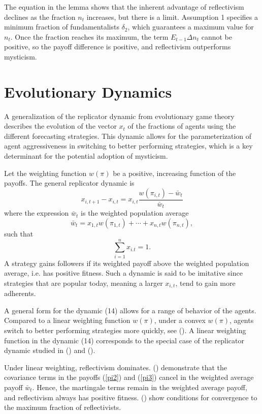\documentclass[12pt]{article}
\begin{document}
The equation in the lemma shows that the inherent advantage of reflectivism declines as the fraction $n_{t}$ increases, but there is a limit. Assumption 1 specifies a minimum fraction of fundamentalists $\delta_{2}$, which guarantees a maximum value for $n_{t}$. Once the fraction reaches its maximum, the term $E_{t-1}\Delta n_{t}$ cannot be positive, so the payoff difference is positive, and reflectivism outperforms mysticism.

\section{Evolutionary Dynamics}
A generalization of the replicator dynamic from evolutionary game theory describes the evolution of the vector $x_{t}$ of the fractions of agents using the different forecasting strategies. This dynamic allows for the parameterization of agent aggressiveness in switching to better performing strategies, which is a key determinant for the potential adoption of mysticism.

Let the weighting function $w(\pi)$ be a positive, increasing function of the payoffs. The general replicator dynamic is
\begin{equation}
x_{i, t+1}-x_{i, t}=x_{i, t} \frac{w\left(\pi_{i, t}\right)-\bar{w}_{t}}{\bar{w}_{t}} 
\label{rep gen}
\end{equation}
where the expression $\bar{w}_{t}$ is the weighted population average 
\[\bar{w}_{t}=x_{1, t} w\left(\pi_{1, t}\right)+\cdots+x_{n, t} w\left(\pi_{n, t}\right),\] 
such that
\[\sum_{i=1}^{n} x_{i . t}=1.\]
A strategy gains followers if its weighted payoff above the weighted population average, i.e.
has positive fitness. Such a dynamic is said to be imitative since strategies that are popular today, meaning a larger $x_{i, t}$, tend to gain more adherents.

A general form for the dynamic (14) allows for a range of behavior of the agents. Compared to a linear weighting function $w(\pi)$, under a convex $w(\pi)$, agents switch to better performing strategies more quickly, see \citeauthor{hofbauer1996evolutionary} (\citeyear{hofbauer1996evolutionary}). A linear weighting function in the dynamic (14) corresponds to the special case of the replicator dynamic studied in \citeauthor{weibull1998evolutionary} (\citeyear{weibull1998evolutionary}) and \citeauthor{samuelson1997evolutionary} (\citeyear{samuelson1997evolutionary}).

Under linear weighting, reflectivism dominates. \citeauthor{Waters2014} (\citeyear{Waters2014}) demonstrate that the covariance terms in the payoffs (\ref{pi2}) and (\ref{pi3}) cancel in the weighted average payoff $\bar{w}_{t}$. Hence, the martingale terms remain in the weighted average payoff, and reflectivism always has positive fitness. \citeauthor{Waters2014} (\citeyear{Waters2014}) show conditions for convergence to the maximum fraction of reflectivists.
\end{document}
